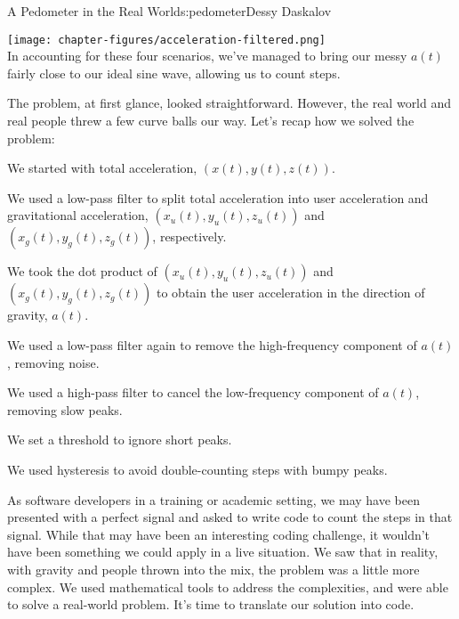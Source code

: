 \begin{aosachapter}{A Pedometer in the Real World}{s:pedometer}{Dessy Daskalov}
\label{peaks-that-are-juuuust-right}

\texttt{[image: chapter-figures/acceleration-filtered.png]}\\ In
accounting for these four scenarios, we've managed to bring our messy
$a(t)$ fairly close to our ideal sine wave, allowing us to count steps.

\label{recap}

The problem, at first glance, looked straightforward. However, the real
world and real people threw a few curve balls our way. Let's recap how
we solved the problem:

\begin{aosaenumerate}
\def\labelenumi{\arabic{enumi}.}

\item
  We started with total acceleration, $(x(t), y(t), z(t))$.
\item
  We used a low-pass filter to split total acceleration into user
  acceleration and gravitational acceleration,
  $(x_{u}(t), y_{u}(t), z_{u}(t))$ and $(x_{g}(t), y_{g}(t), z_{g}(t))$,
  respectively.
\item
  We took the dot product of $(x_{u}(t), y_{u}(t), z_{u}(t))$ and
  $(x_{g}(t), y_{g}(t), z_{g}(t))$ to obtain the user acceleration in
  the direction of gravity, $a(t)$.
\item
  We used a low-pass filter again to remove the high-frequency component
  of $a(t)$, removing noise.
\item
  We used a high-pass filter to cancel the low-frequency component of
  $a(t)$, removing slow peaks.
\item
  We set a threshold to ignore short peaks.
\item
  We used hysteresis to avoid double-counting steps with bumpy peaks.
\end{aosaenumerate}

As software developers in a training or academic setting, we may have
been presented with a perfect signal and asked to write code to count
the steps in that signal. While that may have been an interesting coding
challenge, it wouldn't have been something we could apply in a live
situation. We saw that in reality, with gravity and people thrown into
the mix, the problem was a little more complex. We used mathematical
tools to address the complexities, and were able to solve a real-world
problem. It's time to translate our solution into code.

\label{diving-into-code}


\end{aosachapter}
